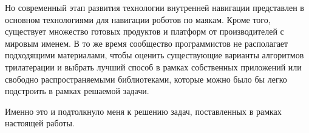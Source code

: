 Но современный этап развития технологии внутренней навигации представлен в основном технологиями для навигации роботов по маякам. Кроме того, существует множество готовых продуктов и платформ от производителей с мировым именем. В то же время сообщество программистов не располагает подходящими материалами, чтобы оценить существующие варианты алгоритмов трилатерации и выбрать лучший способ в рамках собственных приложений или свободно распространяемыми библиотеками, которые можно было бы легко подстроить в рамках решаемой задачи.

Именно это и подтолкнуло меня к решению задач, поставленных в рамках настоящей работы.